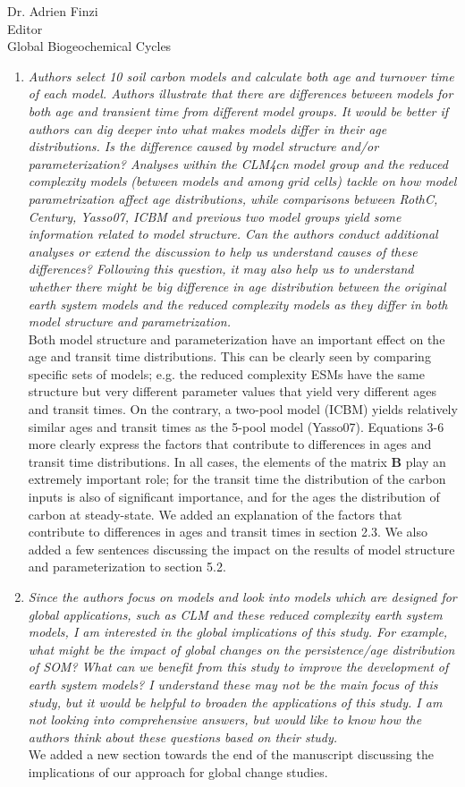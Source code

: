 \documentclass[11pt]{bgcletter}
\begin{document}
\begin{letter}{Dr. Adrien Finzi\\
 Editor \\ Global Biogeochemical Cycles}
\begin{enumerate}
\item {\it Authors select 10 soil carbon models and calculate both age and turnover time of each model. Authors illustrate that there are differences between models for both age and transient time from different model groups. It would be better if authors can dig deeper into what makes models differ in their age distributions. Is the difference caused by model structure and/or parameterization? Analyses within the CLM4cn model group and the reduced complexity models (between models and among grid cells) tackle on how model parametrization affect age distributions, while comparisons between RothC, Century, Yasso07, ICBM and previous two model groups yield some information related to model structure. Can the authors conduct additional analyses or extend the discussion to help us understand causes of these differences? Following this question, it may also help us to understand whether there might be big difference in age distribution between the original earth system models and the reduced complexity models as they differ in both model structure and parametrization. } \\
	{\color{blue} Both model structure and parameterization have an important effect on the age and transit time distributions. This can be clearly seen by comparing specific sets of models; e.g. the reduced complexity ESMs have the same structure but very different parameter values that yield very different ages and transit times. On the contrary, a two-pool model (ICBM) yields relatively similar ages and transit times as the 5-pool model (Yasso07). Equations 3-6 more clearly express the factors that contribute to differences in ages and transit time distributions. In all cases, the elements of the matrix $\mathbf{B}$ play an extremely important role; for the transit time the distribution of the carbon inputs is also of significant importance, and for the ages the distribution of carbon at steady-state. We added an explanation of the factors that contribute to differences in ages and transit times in section 2.3. We also added a few sentences discussing the impact on the results of model structure and parameterization to section 5.2.}
\item {\it Since the authors focus on models and look into models which are designed for global applications, such as CLM and these reduced complexity earth system models, I am interested in the global implications of this study. For example, what might be the impact of global changes on the persistence/age distribution of SOM? What can we benefit from this study to improve the development of earth system models? I understand these may not be the main focus of this study, but it would be helpful to broaden the applications of this study. I am not looking into comprehensive answers, but would like to know how the authors think about these questions based on their study. } \\
	{\color{blue} We added a new section towards the end of the manuscript discussing the implications of our approach for global change studies. }
\end{enumerate}


\end{letter}
\end{document}
